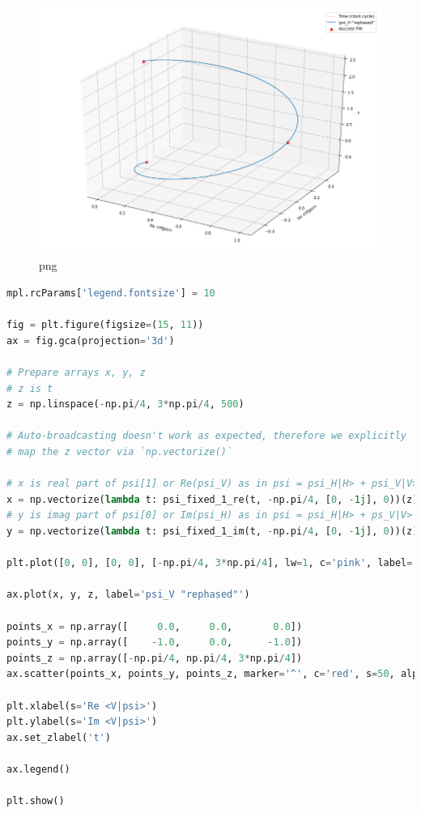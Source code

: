 \begin{figure}
\centering
\includegraphics[width=\textwidth]{img/psi_H.png}
\caption{png}
\end{figure}

\begin{lstlisting}[language=Python]
mpl.rcParams['legend.fontsize'] = 10

fig = plt.figure(figsize=(15, 11))
ax = fig.gca(projection='3d')

# Prepare arrays x, y, z
# z is t
z = np.linspace(-np.pi/4, 3*np.pi/4, 500)

# Auto-broadcasting doesn't work as expected, therefore we explicitly
# map the z vector via `np.vectorize()`

# x is real part of psi[1] or Re(psi_V) as in psi = psi_H|H> + psi_V|V>
x = np.vectorize(lambda t: psi_fixed_1_re(t, -np.pi/4, [0, -1j], 0))(z) 
# y is imag part of psi[0] or Im(psi_H) as in psi = psi_H|H> + ps_V|V>
y = np.vectorize(lambda t: psi_fixed_1_im(t, -np.pi/4, [0, -1j], 0))(z) 

plt.plot([0, 0], [0, 0], [-np.pi/4, 3*np.pi/4], lw=1, c='pink', label='Time (clock cycle)')

ax.plot(x, y, z, label='psi_V "rephased"')

points_x = np.array([     0.0,     0.0,       0.0])
points_y = np.array([    -1.0,     0.0,      -1.0])
points_z = np.array([-np.pi/4, np.pi/4, 3*np.pi/4])
ax.scatter(points_x, points_y, points_z, marker='^', c='red', s=50, alpha=1.0, label='discrete PW')

plt.xlabel(s='Re <V|psi>')
plt.ylabel(s='Im <V|psi>')
ax.set_zlabel('t')

ax.legend()

plt.show()
\end{lstlisting}

